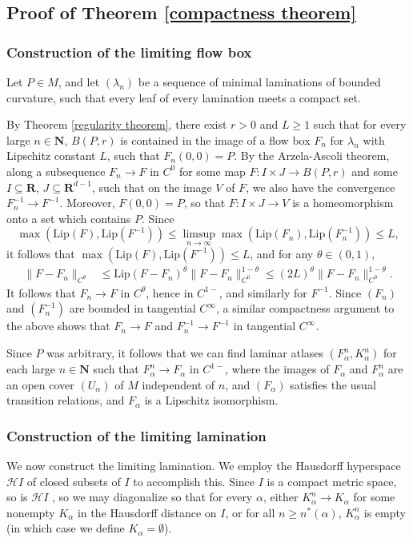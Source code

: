 \documentclass[reqno,11pt]{amsart}
\newcommand{\NN}{\mathbf{N}}
\newcommand{\RR}{\mathbf{R}}
\newcommand{\Hypspace}{\mathscr H}
\newcommand{\Lip}{\mathrm{Lip}}
\theoremstyle{definition}
\numberwithin{equation}{section}
\begin{document}
\subsection{Proof of Theorem \texorpdfstring{\ref{compactness theorem}}{B}}
\subsubsection{Construction of the limiting flow box}
Let $P \in M$, and let $(\lambda_n)$ be a sequence of minimal laminations of bounded curvature, such that every leaf of every lamination meets a compact set.

By Theorem \ref{regularity theorem}, there exist $r > 0$ and $L \geq 1$ such that for every large $n \in \NN$, $B(P, r)$ is contained in the image of a flow box $F_n$ for $\lambda_n$ with Lipschitz constant $L$, such that $F_n(0, 0) = P$.
By the Arzela-Ascoli theorem, along a subsequence $F_n \to F$ in $C^0$ for some map $F: I \times J \to B(P, r)$ and some $I \subseteq \RR$, $J \subseteq \RR^{d - 1}$, such that on the image $V$ of $F$, we also have the convergence $F_n^{-1} \to F^{-1}$.
Moreover, $F(0, 0) = P$, so that $F: I \times J \to V$ is a homeomorphism onto a set which contains $P$.
Since
$$\max(\Lip(F), \Lip(F^{-1})) \leq \limsup_{n \to \infty} \max(\Lip(F_n), \Lip(F_n^{-1})) \leq L,$$
it follows that $\max(\Lip(F), \Lip(F^{-1})) \leq L$, and for any $\theta \in (0, 1)$,
\begin{align*}
	\|F - F_n\|_{C^\theta}
	&\leq \Lip(F - F_n)^\theta \|F - F_n\|_{C^0}^{1 - \theta} \leq (2L)^\theta \|F - F_n\|_{C^0}^{1 - \theta}.
\end{align*}
It follows that $F_n \to F$ in $C^\theta$, hence in $C^{1-}$, and similarly for $F^{-1}$.
Since $(F_n)$ and $(F_n^{-1})$ are bounded in tangential $C^\infty$, a similar compactness argument to the above shows that $F_n \to F$ and $F_n^{-1} \to F^{-1}$ in tangential $C^\infty$.

Since $P$ was arbitrary, it follows that we can find laminar atlases $(F_\alpha^n, K_\alpha^n)$ for each large $n \in \NN$ such that $F_\alpha^n \to F_\alpha$ in $C^{1-}$, where the images of $F_\alpha$ and $F_\alpha^n$ are an open cover $(U_\alpha)$ of $M$ independent of $n$, and $(F_\alpha)$ satisfies the usual transition relations, and $F_\alpha$ is a Lipschitz isomorphism.


\subsubsection{Construction of the limiting lamination}
We now construct the limiting lamination.
We employ the Hausdorff hyperspace $\Hypspace I$ of closed subsets of $I$ to accomplish this.
Since $I$ is a compact metric space, so is $\Hypspace I$ \cite[Theorem 4.17]{nadler2017continuum}, so we may diagonalize so that for every $\alpha$, either $K^n_\alpha \to K_\alpha$ for some nonempty $K_\alpha$ in the Hausdorff distance on $I$, or for all $n \geq n^*(\alpha)$, $K_\alpha^n$ is empty (in which case we define $K_\alpha = \emptyset$).
\end{document}
